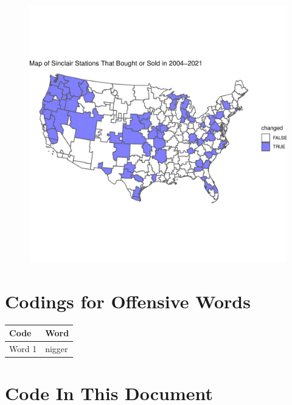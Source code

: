 \documentclass{article}\usepackage[]{graphicx}\usepackage[]{color}
\newenvironment{knitrout}{}{} %
\newenvironment{centerfig}
{\begin{figure}[H]\centering}
{\end{figure}}
\begin{document}
\begin{centerfig}
\begin{knitrout}
\color{fgcolor}
\includegraphics[width=1\linewidth]{figure/unnamed-chunk-3-1} 

\end{knitrout}
\end{centerfig}




\printbibliography{}
\newpage
\appendix{}
\section{Codings for Offensive Words}
\begin{table}[H]
\centering
        \label{words}
        \begin{tabular}{l|l}
            Code & Word \\ \hline
            Word 1  & nigger   \\ \hline
        \end{tabular}
    \end{table}

\section{Code In This Document}
\end{document}

